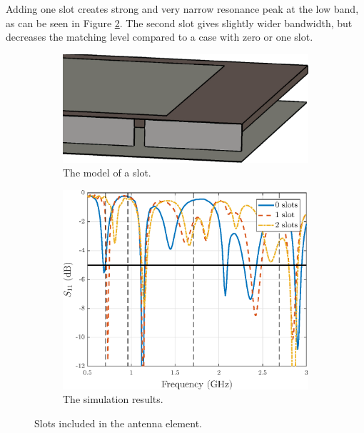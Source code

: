 Adding one slot creates strong and very narrow resonance peak at the low band, as can be seen in Figure \ref{fig:slot_res}. The second slot gives slightly wider bandwidth, but decreases the matching level compared to a case with zero or one slot.

\begin{figure}[H]
    \centering
    \begin{subfigure}[b]{0.49\textwidth}
        \centering
        \includegraphics[width=\textwidth]{img/slot.eps}
        \caption{The model of a slot.}
        \label{fig:slot}
    \end{subfigure}
    \begin{subfigure}[b]{0.49\textwidth}
        \includegraphics[width=\textwidth]{img/slot_res.eps}
        \caption{The simulation results.}
        \label{fig:slot_res}
    \end{subfigure}
    \vspace{-5pt}
    \caption{Slots included in the antenna element.}
    \label{fig:slot_effect}
    \vspace{-15pt}
\end{figure}

